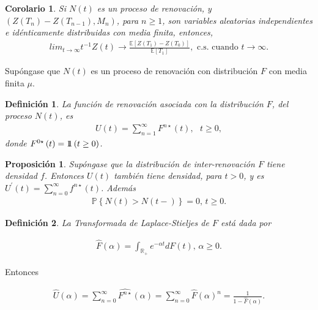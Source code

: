 \documentclass{article}
\newtheorem{Def}{Definición}[section]
\newtheorem{Prop}{Proposición}[section]
\newtheorem{Coro}{Corolario}[section]
\newcommand{\rea}{\mathbb{R}}
\newcommand{\esp}{\mathbb{E}}
\newcommand{\prob}{\mathbb{P}}
\newcommand{\indora}{\mbox{$1$\hspace{-0.8ex}$1$}}
\numberwithin{equation}{section}
\begin{document}
\begin{Coro}
Si $N\left(t\right)$ es un proceso de renovaci\'on, y $\left(Z\left(T_{n}\right)-Z\left(T_{n-1}\right),M_{n}\right)$, para $n\geq1$, son variables aleatorias independientes e id\'enticamente distribuidas con media finita, entonces,
\begin{eqnarray}
lim_{t\rightarrow\infty}t^{-1}Z\left(t\right)\rightarrow\frac{\esp\left[Z\left(T_{1}\right)-Z\left(T_{0}\right)\right]}{\esp\left[T_{1}\right]},\textrm{ c.s. cuando  }t\rightarrow\infty.
\end{eqnarray}
\end{Coro}


Sup\'ongase que $N\left(t\right)$ es un proceso de renovaci\'on con distribuci\'on $F$ con media finita $\mu$.

\begin{Def}
La funci\'on de renovaci\'on asociada con la distribuci\'on $F$, del proceso $N\left(t\right)$, es
\begin{eqnarray*}
U\left(t\right)=\sum_{n=1}^{\infty}F^{n\star}\left(t\right),\textrm{   }t\geq0,
\end{eqnarray*}
donde $F^{0\star}\left(t\right)=\indora\left(t\geq0\right)$.
\end{Def}


\begin{Prop}
Sup\'ongase que la distribuci\'on de inter-renovaci\'on $F$ tiene densidad $f$. Entonces $U\left(t\right)$ tambi\'en tiene densidad, para $t>0$, y es $U^{'}\left(t\right)=\sum_{n=0}^{\infty}f^{n\star}\left(t\right)$. Adem\'as
\begin{eqnarray*}
\prob\left\{N\left(t\right)>N\left(t-\right)\right\}=0\textrm{,   }t\geq0.
\end{eqnarray*}
\end{Prop}

\begin{Def}
La Transformada de Laplace-Stieljes de $F$ est\'a dada por

\begin{eqnarray*}
\hat{F}\left(\alpha\right)=\int_{\rea_{+}}e^{-\alpha t}dF\left(t\right)\textrm{,  }\alpha\geq0.
\end{eqnarray*}
\end{Def}

Entonces

\begin{eqnarray*}
\hat{U}\left(\alpha\right)=\sum_{n=0}^{\infty}\hat{F^{n\star}}\left(\alpha\right)=\sum_{n=0}^{\infty}\hat{F}\left(\alpha\right)^{n}=\frac{1}{1-\hat{F}\left(\alpha\right)}.
\end{eqnarray*}
\end{document}
